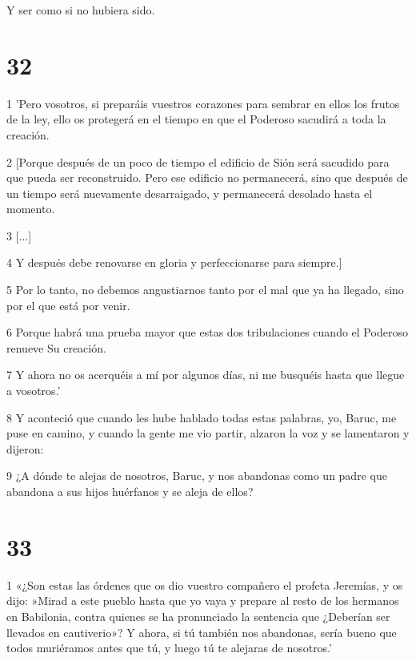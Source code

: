 \par Y ser como si no hubiera sido.

\chapter{32}

\par 1 'Pero vosotros, si preparáis vuestros corazones para sembrar en ellos los frutos de la ley, ello os protegerá en el tiempo en que el Poderoso sacudirá a toda la creación.

\par 2 [Porque después de un poco de tiempo el edificio de Sión será sacudido para que pueda ser reconstruido. Pero ese edificio no permanecerá, sino que después de un tiempo será nuevamente desarraigado, y permanecerá desolado hasta el momento.

\par 3 [...]

\par 4 Y después debe renovarse en gloria y perfeccionarse para siempre.]

\par 5 Por lo tanto, no debemos angustiarnos tanto por el mal que ya ha llegado, sino por el que está por venir.

\par 6 Porque habrá una prueba mayor que estas dos tribulaciones cuando el Poderoso renueve Su creación.

\par 7 Y ahora no os acerquéis a mí por algunos días, ni me busquéis hasta que llegue a vosotros.'

\par 8 Y aconteció que cuando les hube hablado todas estas palabras, yo, Baruc, me puse en camino, y cuando la gente me vio partir, alzaron la voz y se lamentaron y dijeron:

\par 9 ¿A dónde te alejas de nosotros, Baruc, y nos abandonas como un padre que abandona a sus hijos huérfanos y se aleja de ellos?

\chapter{33}

\par 1 «¿Son estas las órdenes que os dio vuestro compañero el profeta Jeremías, y os dijo: »Mirad a este pueblo hasta que yo vaya y prepare al resto de los hermanos en Babilonia, contra quienes se ha pronunciado la sentencia que ¿Deberían ser llevados en cautiverio»? Y ahora, si tú también nos abandonas, sería bueno que todos muriéramos antes que tú, y luego tú te alejaras de nosotros.'


